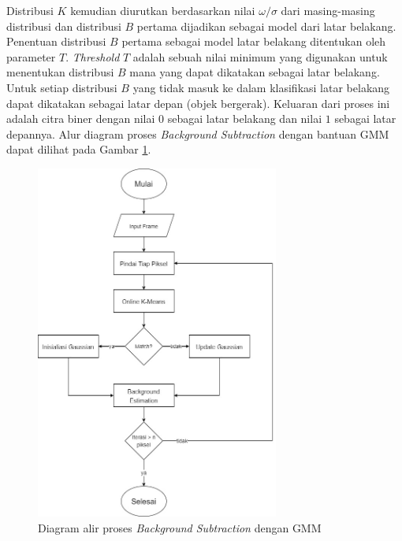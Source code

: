         Distribusi $K$ kemudian diurutkan berdasarkan nilai $\omega/\sigma$ dari masing-masing distribusi dan distribusi $B$ pertama dijadikan sebagai model dari latar belakang. Penentuan distribusi $B$ pertama sebagai model latar belakang ditentukan oleh parameter $T$. \textit{Threshold} $T$ adalah sebuah nilai minimum yang digunakan untuk menentukan distribusi $B$ mana yang dapat dikatakan sebagai latar belakang. Untuk setiap distribusi $B$ yang tidak masuk ke dalam klasifikasi latar belakang dapat dikatakan sebagai latar depan (objek bergerak). Keluaran dari proses ini adalah citra biner dengan nilai $0$ sebagai latar belakang dan nilai $1$ sebagai latar depannya. Alur diagram proses \textit{Background Subtraction} dengan bantuan GMM dapat dilihat pada Gambar \ref{fig:gmmflowchart}.
        \begin{figure}[H]
        \centering
          \singlespacing
          \captionsetup{justification=centering,margin=0.5cm}
          \includegraphics[width=8cm]{image/FlowChart-GMM.jpg}
          \caption{Diagram alir proses \textit{Background Subtraction} dengan GMM}
          \label{fig:gmmflowchart}
        \end{figure}
        
